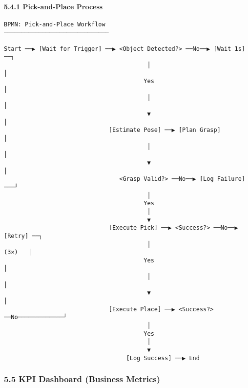 \documentclass[
]{article}
\begin{document}
\hypertarget{pick-and-place-process}{%
\paragraph{5.4.1 Pick-and-Place Process}\label{pick-and-place-process}}

\begin{verbatim}
BPMN: Pick-and-Place Workflow
──────────────────────────────

Start ──▶ [Wait for Trigger] ──▶ <Object Detected?> ──No──▶ [Wait 1s] ──┐
                                         │                                │
                                        Yes                               │
                                         │                                │
                                         ▼                                │
                              [Estimate Pose] ──▶ [Plan Grasp]           │
                                         │                                │
                                         ▼                                │
                                 <Grasp Valid?> ──No──▶ [Log Failure] ───┘
                                         │
                                        Yes
                                         │
                                         ▼
                              [Execute Pick] ──▶ <Success?> ──No──▶ [Retry] ──┐
                                         │                              (3×)   │
                                        Yes                                    │
                                         │                                     │
                                         ▼                                     │
                              [Execute Place] ──▶ <Success?> ──No─────────────┘
                                         │
                                        Yes
                                         │
                                         ▼
                                   [Log Success] ──▶ End
\end{verbatim}

\hypertarget{kpi-dashboard-business-metrics}{%
\subsubsection{5.5 KPI Dashboard (Business
Metrics)}\label{kpi-dashboard-business-metrics}}
\end{document}
